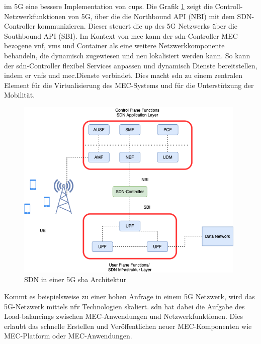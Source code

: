 \documentclass[runningheads]{llncs}
\numberwithin{figure}{section}
\begin{document}
im 5G eine bessere Implementation von \acrfull{cups}. Die Grafik \ref{fig:sdn2} zeigt die Controll-Netzwerkfunktionen von 5G,
über die die Northbound API (NBI) mit dem SDN-Controller kommunizieren. Dieser steuert die \acrshort{up} des 5G Netzwerks über
die Southbound API (SBI).
Im Kontext von \acrshort{mec} kann der \acrshort{sdn}-Controller MEC bezogene \acrshort{vnf}, 
\acrshort{vm}s und Container als eine weitere Netzwerkkomponente behandeln, die dynamisch zugewiesen und neu lokalisiert werden kann.
So kann der \acrshort{sdn}-Controller flexibel Services anpassen und dynamisch Dienste bereitstellen, 
indem er \acrshort{vnf}s und \acrshort{mec}.Dienste verbindet. Dies macht \acrshort{sdn} zu einem zentralen Element für die Virtualisierung
des MEC-Systems und für die Unterstützung der Mobilität.
\begin{figure}
  \centering
  \includegraphics[width=11cm]{images/sdn2.png}
  \caption{SDN in einer 5G \acrshort{sba} Architektur}
  \label{fig:sdn2}
\end{figure}
Kommt es beispielsweise zu einer hohen Anfrage in einem 5G Netzwerk, wird das 5G-Netzwerk mittels \acrshort{nfv} Technologien skaliert.
\acrshort{sdn} hat dabei die Aufgabe des Load-balancings zwischen MEC-Anwendungen und Netzwerkfunktionen. Dies erlaubt das 
schnelle Erstellen und Veröffentlichen neuer MEC-Komponenten wie MEC-Platform oder MEC-Anwendungen.
\end{document}

